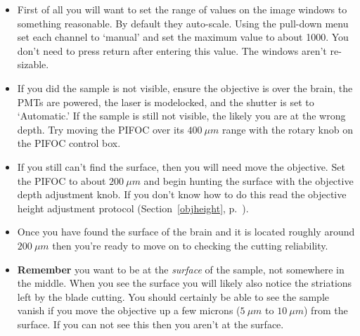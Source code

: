 \documentclass[paper=a4, fontsize=11pt]{scrartcl} %
\numberwithin{equation}{section} %
\numberwithin{figure}{section} %
\numberwithin{table}{section} %
\begin{document}
\begin{itemize}
\item First of all you will want to set the range of values on the image windows to something reasonable. By default they auto-scale. 
Using the pull-down menu set each channel to `manual' and set the maximum value to about 1000. You don't need to press return after
 entering this value. 
 The windows aren't re-sizable.

\item If you did the sample is not visible, ensure the objective is over the brain, the PMTs are powered, the laser is modelocked, and the shutter is set to `Automatic.'
If the sample is still not visible, the likely you are at the wrong depth. 
Try moving the PIFOC over its $400~\mu m$ range with the rotary knob on the PIFOC control box. 

\item If you still can't find the surface, then you will need move the objective. 
Set the PIFOC to about $200~\mu m$ and begin hunting the surface with the objective depth adjustment knob. 
If you don't know how to do this read the objective height adjustment protocol (Section~\ref{objheight}, p.~\pageref{objheight}). 

\item Once you have found the surface of the brain and it is located roughly around $200~\mu m$ then you're ready to move on to checking the cutting reliability. 

\item \textbf{Remember} you want to be at the \textit{surface} of the sample, not somewhere in the middle. 
When you see the surface you will likely also notice the striations left by the blade cutting. 
You should certainly be able to see the sample vanish if you move the objective up a few microns ($5~\mu m$ to $10~\mu m$) from the surface. 
If you can not see this then you aren't at the surface. 
\end{itemize}
\end{document}
